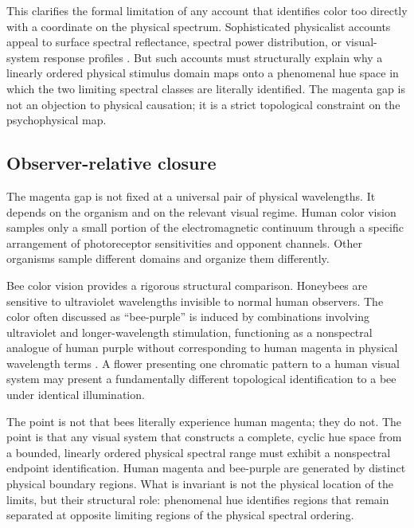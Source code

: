\documentclass[preprint,12pt,authoryear]{elsarticle}
\theoremstyle{plain}
\theoremstyle{definition}
\theoremstyle{remark}
\begin{document}
This clarifies the formal limitation of any account that identifies color too directly with a coordinate on the physical spectrum. Sophisticated physicalist accounts appeal to surface spectral reflectance, spectral power distribution, or visual-system response profiles \citep{ByrneHilbert2003}. But such accounts must structurally explain why a linearly ordered physical stimulus domain maps onto a phenomenal hue space in which the two limiting spectral classes are literally identified. The magenta gap is not an objection to physical causation; it is a strict topological constraint on the psychophysical map.

\subsection{Observer-relative closure}
\label{subsec:observer-relative-closure}

\noindent The magenta gap is not fixed at a universal pair of physical wavelengths. It depends on the organism and on the relevant visual regime. Human color vision samples only a small portion of the electromagnetic continuum through a specific arrangement of photoreceptor sensitivities and opponent channels. Other organisms sample different domains and organize them differently.

Bee color vision provides a rigorous structural comparison. Honeybees are sensitive to ultraviolet wavelengths invisible to normal human observers. The color often discussed as ``bee-purple'' is induced by combinations involving ultraviolet and longer-wavelength stimulation, functioning as a nonspectral analogue of human purple without corresponding to human magenta in physical wavelength terms \citep{Thompson1995,Lunau2018}. A flower presenting one chromatic pattern to a human visual system may present a fundamentally different topological identification to a bee under identical illumination.

The point is not that bees literally experience human magenta; they do not. The point is that any visual system that constructs a complete, cyclic hue space from a bounded, linearly ordered physical spectral range must exhibit a nonspectral endpoint identification. Human magenta and bee-purple are generated by distinct physical boundary regions. What is invariant is not the physical location of the limits, but their structural role: phenomenal hue identifies regions that remain separated at opposite limiting regions of the physical spectral ordering.
\end{document}

